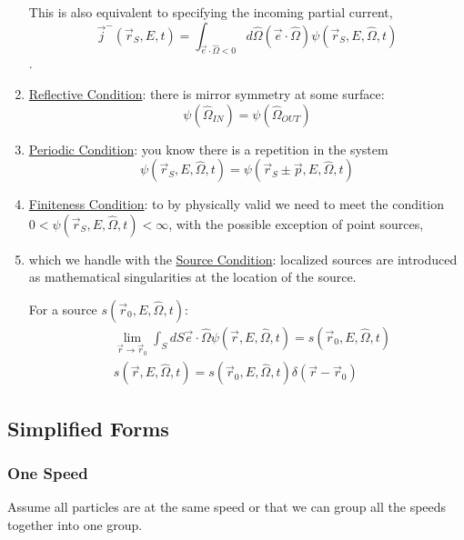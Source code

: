\documentclass[12pt]{article}
\newlength{\up}
\newcommand{\vOmega}{\ensuremath{\hat{\Omega}}}
\begin{document}
\begin{enumerate}
\begin{minipage}{0.45\textwidth}
This is also equivalent to specifying the incoming partial current, $$\vec{j}^-(\vec{r}_S, E, t) = \int_{\vec{e} \cdot \vOmega < 0} d\vOmega (\vec{e} \cdot \vOmega) \psi(\vec{r}_S, E, \vOmega, t)$$.
\end{minipage}

\item \underline{Reflective Condition}: there is mirror symmetry at some surface:
\[\psi(\vOmega_{IN}) = \psi(\vOmega_{OUT})\]

\item \underline{Periodic Condition}: you know there is a repetition in the system
\[\psi(\vec{r}_S, E, \vOmega, t) = \psi(\vec{r}_S \pm \vec{p}, E, \vOmega, t)\]

\item \underline{Finiteness Condition}: to by physically valid we need to meet the condition $0 < \psi(\vec{r}_S, E, \vOmega, t) < \infty$, with the possible exception of point sources,

\item which we handle with the \underline{Source Condition}: localized sources are introduced as mathematical singularities at the location of the source.

For a source $s(\vec{r}_0, E, \vOmega, t)$:
\begin{align}
&\lim_{\vec{r} \rightarrow \vec{r}_0} \int_S dS \vec{e} \cdot \vOmega \psi(\vec{r}, E, \vOmega, t) = s(\vec{r}_0, E, \vOmega, t) \\
&s(\vec{r}, E, \vOmega, t) = s(\vec{r}_0, E, \vOmega, t)\delta(\vec{r} - \vec{r}_0)
\end{align}
\end{enumerate}


\subsection{Simplified Forms}

\subsubsection{One Speed}
Assume all particles are at the same speed or that we can group all the speeds together into one group.
\end{document}
